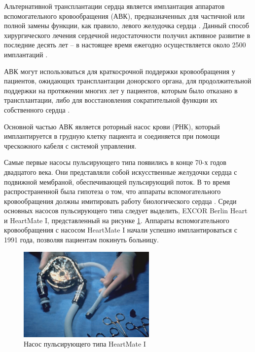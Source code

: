 Альтернативной трансплантации сердца является имплантация аппаратов вспомогательного кровообращения (АВК), предназначенных для частичной или полной замены функции, как правило, левого желудочка сердца \cite{Patel2014667, Mancini_2015, HT_LVAD_2013, daners2017left}. Данный способ хирургического лечения сердечной недостаточности получил активное развитие в последние десять лет -- в настоящее время ежегодно осуществляется около 2500 имплантаций \cite{kirklin2015seventh}.

АВК могут использоваться для краткосрочной поддержки кровообращения у пациентов, ожидающих трансплантации донорского органа, для продолжительной поддержки на протяжении многих лет у пациентов, которым было отказано в трансплантации, либо для восстановления сократительной функции их собственного сердца \cite{ottenberg_choices_2014, selzman_bridge_2015, drakos_clinical_2016, wever2016cardiac}. 

Основной частью АВК является роторный насос крови (РНК), который имплантируется в грудную клетку пациента и соединяется при помощи чрескожного кабеля с системой управления.

Самые первые насосы пульсирующего типа появились в конце 70-х годов двадцатого века. Они представляли собой искусственные желудочки сердца с подвижной мембраной, обеспечивающей пульсирующий поток. В то время распространенной была гипотеза о том, что аппараты вспомогательного кровообращения должны имитировать работу биологического сердца \cite{frazier2017invited}. Среди основных насосов пульсирующего типа следует выделить, EXCOR Berlin Heart и HeartMate I, представленный на рисунке \ref{img:heartmate_one}. Аппараты вспомогательного кровообращения с насосом HeartMate I начали успешно имплантироваться с 1991 года, позволяя пациентам покинуть больницу.

\begin{figure}[ht] 
  \center
  \includegraphics [width=0.6\textwidth] {../images/c1_heartmate_one}
  \caption{Насос пульсирующего типа HeartMate I \cite{frazier2017invited}} 
  \label{img:heartmate_one}  
\end{figure}

